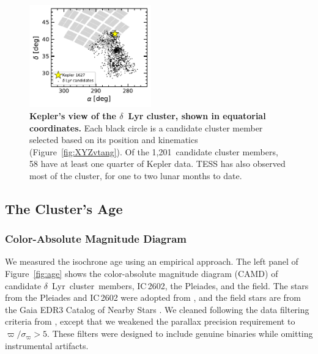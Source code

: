 \documentclass[12pt,modern,twocolumn,tighten]{aastex63}
\newcommand{\cn}{$\delta$\ Lyr\ cluster} %
\newcommand{\nkinematic}{1{,}201} %
\begin{document}
\begin{figure}[t]
	\begin{center}
		\leavevmode
		\includegraphics[width=0.47\textwidth]{f2.pdf}
	\end{center}
	\vspace{-0.7cm}
	\caption{
    {\bf Kepler's view of the $\delta$~Lyr cluster, shown in equatorial
    	coordinates.} Each black circle
    is a candidate cluster member selected based on its position and kinematics (Figure~\ref{fig:XYZvtang}).  Of
    the \nkinematic\ candidate cluster members, 58 have at least one
    quarter of Kepler data.  TESS has also observed most of the
    cluster, for one to two lunar months to date.
		\label{fig:skychart}
	}
\end{figure}


\subsection{The Cluster's Age}
\label{sec:clusterage}


\subsubsection{Color-Absolute Magnitude Diagram}
\label{sec:camd}

We measured the isochrone age using an empirical approach.  The left
panel of Figure~\ref{fig:age} shows the color-absolute magnitude
diagram (CAMD) of candidate \cn\ members, IC\,2602, the Pleiades, and
the field. The stars from the Pleiades and IC\,2602 were adopted from
\citet{CantatGaudin2018a}, and the field stars are from the Gaia EDR3
Catalog of Nearby Stars \citep{gaia_gcns_2021}. We cleaned 
following the data filtering criteria from \citet[][Appendix
B]{GaiaCollaboration2018}, except that we weakened the parallax
precision requirement to $\varpi/\sigma_\varpi>5$.   These filters were
designed to include genuine binaries while omitting instrumental
artifacts.  
\end{document}
